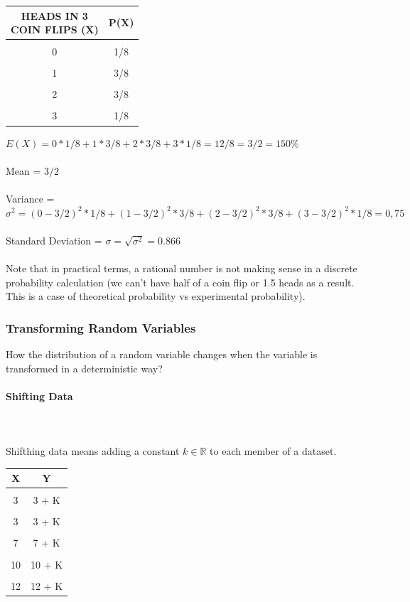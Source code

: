\documentclass{article}
\begin{document}
\begin{center}
\begin{tabular}{|c|c|}
\hline
\makecell {HEADS IN 3 \\ COIN FLIPS (X)} & P(X)\\ \hline
&\\[-1em]
0 & 1/8 \\ \hline
&\\[-1em]
1 & 3/8 \\ \hline
&\\[-1em]
2 & 3/8 \\ \hline
&\\[-1em]
3 & 1/8 \\ 
\hline
\end{tabular}
\end{center}

$E(X) = 0 * 1/8 + 1 * 3/8 + 2 * 3/8  + 3 * 1/8 = 12 / 8  = 3 / 2 = 150\%  $ \\ 
\mbox{}\\
Mean = $3 / 2$ \\ 
\mbox{}\\
Variance = $\sigma^2 = (0 - 3/2)^2 * 1/8 + (1 - 3/2)^2 * 3/8 + (2 - 3/2)^2 * 3/8 + (3 - 3/2)^2 * 1/8 =  0,75$ \\ 
\mbox{}\\
Standard Deviation = $\sigma = \sqrt{\sigma^2} = 0.866$ \\ 
\mbox{}\\
Note that in practical terms, a rational number is not making sense in a discrete probability calculation (we can’t have half of a coin flip or 1.5 heads as a result. This is a case of theoretical probability vs experimental probability).   

\subsubsection{Transforming Random Variables}
How the distribution of a random variable changes when the variable is transformed in a deterministic way?

\paragraph{Shifting Data}\mbox{} \\
\mbox{} \\
Shifthing data means adding a constant $k \in \mathbb{R}$ to each member of a dataset.
\begin{center}
\begin{tabular}{|c|c|}
\hline
X & Y\\ \hline
&\\[-1em]
3 & 3 + K \\ \hline
&\\[-1em]
3 & 3 + K \\ \hline
&\\[-1em]
7 & 7 + K \\ \hline
&\\[-1em]
10 & 10 + K \\ \hline
&\\[-1em]
12 & 12 + K \\ 
\hline
\end{tabular}
\end{center}
\end{document}
